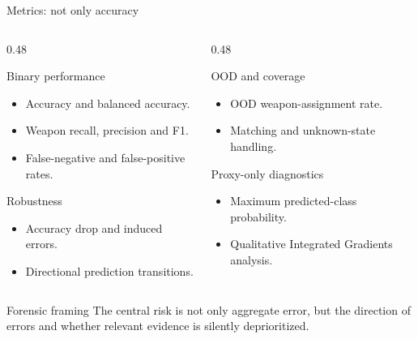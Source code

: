 \documentclass{beamer}
\begin{document}
\begin{frame}[shrink=2]{Metrics: not only accuracy}

\small

\begin{columns}

\begin{column}{0.48\textwidth}

\begin{block}{Binary performance}
\begin{itemize}
    \item Accuracy and balanced accuracy.
    \item Weapon recall, precision and F1.
    \item False-negative and false-positive rates.
\end{itemize}
\end{block}

\begin{block}{Robustness}
\begin{itemize}
    \item Accuracy drop and induced errors.
    \item Directional prediction transitions.
\end{itemize}
\end{block}

\end{column}

\begin{column}{0.48\textwidth}

\begin{block}{OOD and coverage}
\begin{itemize}
    \item OOD weapon-assignment rate.
    \item Matching and unknown-state handling.
\end{itemize}
\end{block}

\begin{block}{Proxy-only diagnostics}
\begin{itemize}
    \item Maximum predicted-class probability.
    \item Qualitative Integrated Gradients analysis.
\end{itemize}
\end{block}

\end{column}

\end{columns}

\begin{block}{Forensic framing}
The central risk is not only aggregate error, but the direction of errors and whether relevant evidence is silently deprioritized.
\end{block}

\end{frame}
\end{document}
